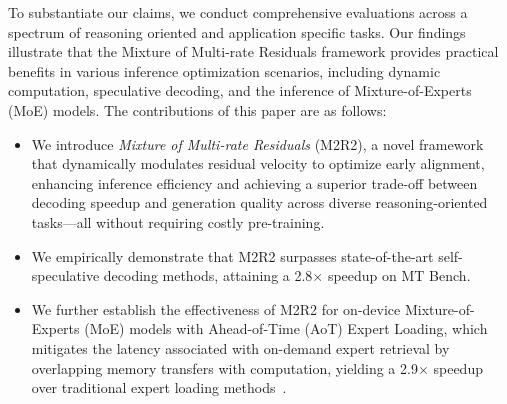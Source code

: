 
To substantiate our claims, we conduct comprehensive evaluations across a spectrum of reasoning oriented and application specific tasks. Our findings illustrate that the Mixture of Multi-rate Residuals framework provides practical benefits in various inference optimization scenarios, including dynamic computation, speculative decoding, and the inference of Mixture-of-Experts (MoE) models. The contributions of this paper are as follows:
\begin{itemize}
    \item We introduce \textit{Mixture of Multi-rate Residuals} (M2R2), a novel framework that dynamically modulates residual velocity to optimize early alignment, enhancing inference efficiency and achieving a superior trade-off between decoding speedup and generation quality across diverse reasoning-oriented tasks—all without requiring costly pre-training.
    \item We empirically demonstrate that M2R2 surpasses state-of-the-art self-speculative decoding methods, attaining a 2.8$\times$ speedup on MT Bench.
    \item We further establish the effectiveness of M2R2 for on-device Mixture-of-Experts (MoE) models with Ahead-of-Time (AoT) Expert Loading, which mitigates the latency associated with on-demand expert retrieval by overlapping memory transfers with computation, yielding a 2.9$\times$ speedup over traditional expert loading methods~\citep{lepikhin2020gshard, fedus2022switch}.
\end{itemize}
